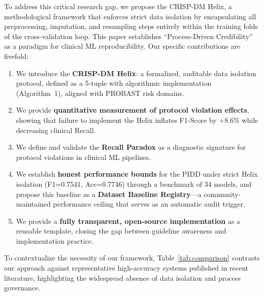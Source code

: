 \documentclass[3p,twocolumn]{elsarticle}
\begin{document}
To address this critical research gap, we propose the CRISP-DM Helix, a methodological framework that enforces strict data isolation by encapsulating all preprocessing, imputation, and resampling steps entirely within the training folds of the cross-validation loop. This paper establishes ``Process-Driven Credibility'' as a paradigm for clinical ML reproducibility. Our specific contributions are fivefold:

\begin{enumerate}[nosep]
    \item We introduce the \textbf{CRISP-DM Helix}: a formalized, auditable data isolation protocol, defined as a 5-tuple with algorithmic implementation (Algorithm~1), aligned with PROBAST risk domains.
    \item We provide \textbf{quantitative measurement of protocol violation effects}, showing that failure to implement the Helix inflates F1-Score by $+8.6\%$ while decreasing clinical Recall.
    \item We define and validate the \textbf{Recall Paradox} as a diagnostic signature for protocol violations in clinical ML pipelines.
    \item We establish \textbf{honest performance bounds} for the PIDD under strict Helix isolation (F1=0.7541, Acc=0.7746) through a benchmark of 34 models, and propose this baseline as a \textbf{Dataset Baseline Registry}---a community-maintained performance ceiling that serves as an automatic audit trigger.
    \item We provide a \textbf{fully transparent, open-source implementation} as a reusable template, closing the gap between guideline awareness and implementation practice.
\end{enumerate}

To contextualize the necessity of our framework, Table~\ref{tab:comparison} contrasts our approach against representative high-accuracy systems published in recent literature, highlighting the widespread absence of data isolation and process governance.
\end{document}
